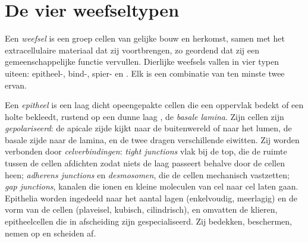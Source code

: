 \section{De vier weefseltypen}

\begin{definition}[Weefsel]\label{def:b1:body-plans-tissues:tissue}
Een \emph{weefsel} is een groep cellen van gelijke bouw en
herkomst, samen met het extracellulaire materiaal dat zij voortbrengen, zo
geordend dat zij een gemeenschappelijke functie vervullen. Dierlijke weefsels
vallen in vier typen uiteen: epitheel-, bind-, spier- en . Elk
 is een combinatie van ten minste twee ervan.
\end{definition}

\begin{definition}[Epitheelweefsel]\label{def:b1:body-plans-tissues:epithelium}
Een \emph{epitheel} is een laag dicht opeengepakte cellen die
een oppervlak bedekt of een holte bekleedt, rustend op een dunne laag
, de \emph{basale lamina}. Zijn
cellen zijn \emph{gepolariseerd}: de apicale zijde kijkt
naar de buitenwereld of naar het lumen, de basale zijde naar de lamina, en de
twee dragen verschillende eiwitten. Zij worden verbonden door
\emph{celverbindingen}: \emph{tight junctions} vlak bij de
top, die de ruimte tussen de cellen afdichten zodat niets de laag passeert
behalve door de cellen heen; \emph{adherens junctions} en
\emph{desmosomen}, die de cellen mechanisch vastzetten; \emph{gap
junctions}, kanalen die ionen en kleine moleculen van cel naar cel laten gaan.
Epithelia worden ingedeeld naar het aantal lagen (enkelvoudig, meerlagig) en de
vorm van de cellen (plaveisel, kubisch, cilindrisch), en omvatten de klieren,
epitheelcellen die in afscheiding zijn gespecialiseerd. Zij bedekken,
beschermen, nemen op en scheiden af.
\end{definition}

